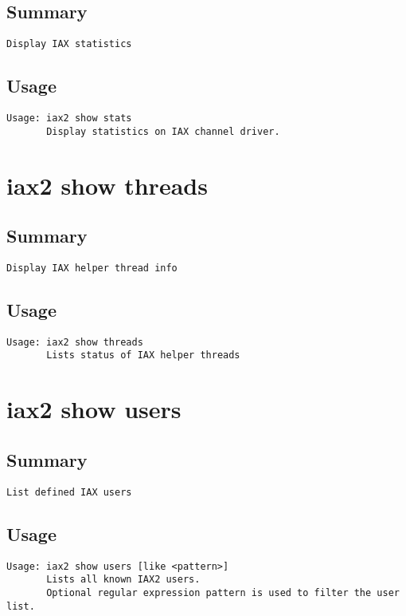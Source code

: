 \subsection{Summary}
\begin{verbatim}
Display IAX statistics
\end{verbatim}
\subsection{Usage}
\begin{verbatim}
Usage: iax2 show stats
       Display statistics on IAX channel driver.

\end{verbatim}


\section{iax2 show threads}
\subsection{Summary}
\begin{verbatim}
Display IAX helper thread info
\end{verbatim}
\subsection{Usage}
\begin{verbatim}
Usage: iax2 show threads
       Lists status of IAX helper threads

\end{verbatim}


\section{iax2 show users}
\subsection{Summary}
\begin{verbatim}
List defined IAX users
\end{verbatim}
\subsection{Usage}
\begin{verbatim}
Usage: iax2 show users [like <pattern>]
       Lists all known IAX2 users.
       Optional regular expression pattern is used to filter the user list.

\end{verbatim}


